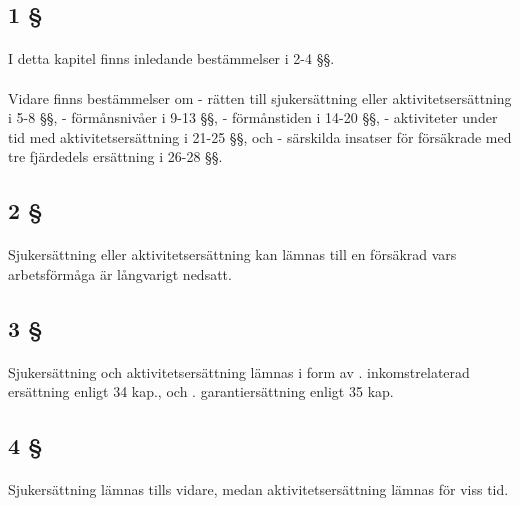 \documentclass[a4paper,notitlepage,openany,10pt]{book}
\begin{document}
\subsection*{1 §}
\paragraph*{}
I detta kapitel finns inledande bestämmelser i 2-4 §§.
\paragraph*{}
Vidare finns bestämmelser om
\newline - rätten till sjukersättning eller aktivitetsersättning i 5-8 §§,
\newline - förmånsnivåer i 9-13 §§,
\newline - förmånstiden i 14-20 §§,
\newline - aktiviteter under tid med aktivitetsersättning i 21-25 §§, och
\newline - särskilda insatser för försäkrade med tre fjärdedels ersättning i 26-28 §§.
\subsection*{2 §}
\paragraph*{}
Sjukersättning eller aktivitetsersättning kan lämnas till en försäkrad vars arbetsförmåga är långvarigt nedsatt.
\subsection*{3 §}
\paragraph*{}
Sjukersättning och aktivitetsersättning lämnas i form av
. inkomstrelaterad ersättning enligt 34 kap., och
. garantiersättning enligt 35 kap.
\subsection*{4 §}
\paragraph*{}
Sjukersättning lämnas tills vidare, medan aktivitetsersättning lämnas för viss tid.
\end{document}
